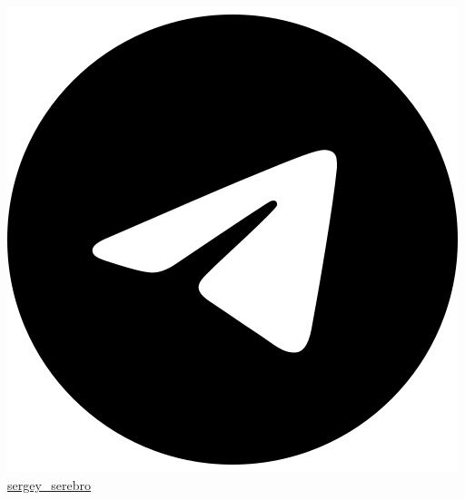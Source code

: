 \documentclass[]{private}
\begin{document}
{    \href{https://t.me/sergey_serebro}{\includegraphics[scale=0.03, trim={0cm 5cm -0.4cm -2cm}]{icons/main/telegram-brands-solid.png} sergey\_serebro}}

%
%
\end{document}
